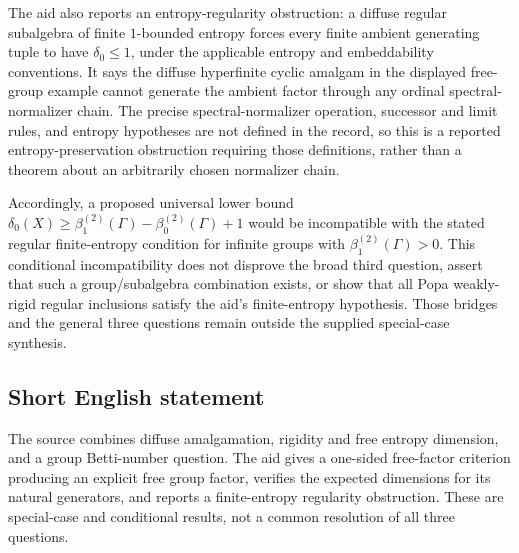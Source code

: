 \documentclass[11pt]{article}
\begin{document}
The aid also reports an entropy-regularity obstruction: a diffuse regular subalgebra of finite $1$-bounded entropy forces every finite ambient generating tuple to have $\delta_0\leq1$, under the applicable entropy and embeddability conventions. It says the diffuse hyperfinite cyclic amalgam in the displayed free-group example cannot generate the ambient factor through any ordinal spectral-normalizer chain. The precise spectral-normalizer operation, successor and limit rules, and entropy hypotheses are not defined in the record, so this is a reported entropy-preservation obstruction requiring those definitions, rather than a theorem about an arbitrarily chosen normalizer chain.

Accordingly, a proposed universal lower bound $\delta_0(X)\geq\beta_1^{(2)}(\Gamma)-\beta_0^{(2)}(\Gamma)+1$ would be incompatible with the stated regular finite-entropy condition for infinite groups with $\beta_1^{(2)}(\Gamma)>0$. This conditional incompatibility does not disprove the broad third question, assert that such a group/subalgebra combination exists, or show that all Popa weakly-rigid regular inclusions satisfy the aid's finite-entropy hypothesis. Those bridges and the general three questions remain outside the supplied special-case synthesis.
\subsection{Short English statement}
The source combines diffuse amalgamation, rigidity and free entropy dimension, and a group Betti-number question. The aid gives a one-sided free-factor criterion producing an explicit free group factor, verifies the expected dimensions for its natural generators, and reports a finite-entropy regularity obstruction. These are special-case and conditional results, not a common resolution of all three questions.
\end{document}

